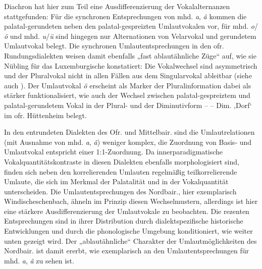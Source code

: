 Diachron hat hier zum Teil eine Ausdifferenzierung der Vokalalternanzen stattgefunden: Für die synchronen Entsprechungen von mhd. \textit{a}, \textit{â} kommen die palatal-gerundeten neben den palatal-gespreizten Umlautvokalen vor, für mhd. \textit{o}/\textit{ö} und mhd. \textit{u}/\textit{ü} sind hingegen nur Alternationen von Velarvokal und gerundetem Umlautvokal belegt. Die synchronen Umlautentsprechungen in den ofr. Rundungsdialekten weisen damit ebenfalls „fast ablautähnliche Züge“ \citep[123]{Nübling2006} auf, wie sie Nübling für das Luxemburgische konstatiert: Die Vokalwechsel sind asymmetrisch und der Pluralvokal nicht in allen Fällen aus dem Singularvokal ableitbar (siehe auch \citealt[118]{Nübling2006}). Der Umlautvokal \textit{ö} erscheint als Marker der Pluralinformation dabei als stärker funktionalisiert, wie auch der Wechsel zwischen palatal-gespreiztem und palatal-gerundetem Vokal in der Plural- und der Diminutivform  --  -- Dim.  ‚Dorf‘ im ofr. Hüttenheim belegt.

In den entrundeten Dialekten des Ofr. und Mittelbair. sind die Umlautrelationen (mit Ausnahme von mhd. \textit{a}, \textit{â}) weniger komplex, die Zuordnung von Basis- und Umlautvokal entspricht einer 1:1-Zuordnung. Da innerparadigmatische Vokalquantitätskontraste in diesen Dialekten ebenfalls morphologisiert sind, finden sich neben den korrelierenden Umlauten regelmäßig teilkorrelierende Umlaute, die sich im Merkmal der Palatalität und in der Vokalquantität unterscheiden. Die Umlautentsprechungen des Nordbair., hier exemplarisch Win\-discheschenbach, ähneln im Prinzip diesen Wechselmustern, allerdings ist hier eine stärkere Ausdifferenzierung der Umlautvokale zu beobachten. Die rezenten Entsprechungen sind in ihrer Distribution durch dialektspezifische historische Entwicklungen und durch die phonologische Umgebung konditioniert, wie weiter unten gezeigt wird. Der „ablautähnliche“ Charakter der Umlautmöglichkeiten des Nordbair. ist damit ererbt, wie exemplarisch an den Umlautentsprechungen für mhd. \textit{a}, \textit{â} zu sehen ist.

